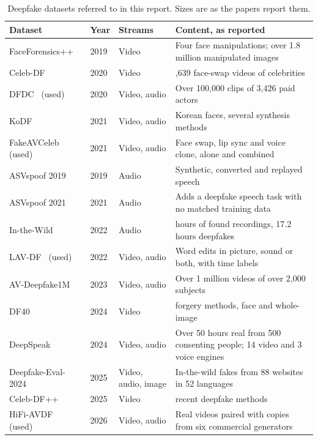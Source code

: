 \begin{table}[ht]
    \centering
    \small
    \caption{Deepfake datasets referred to in this report. Sizes are as the papers report them.}
    \label{tab:datasets}
    \begin{tabularx}{\textwidth}{@{}l l l >{\raggedright\arraybackslash}X@{}}
        \toprule
        \textbf{Dataset} & \textbf{Year} & \textbf{Streams} & \textbf{Content, as reported} \\
        \midrule
        FaceForensics++~\cite{ffpp} & 2019 & Video & Four face manipulations; over 1.8 million manipulated images \\
        Celeb-DF~\cite{celebdf} & 2020 & Video & 5,639 face-swap videos of celebrities \\
        DFDC~\cite{dfdc} (used) & 2020 & Video, audio & Over 100,000 clips of 3,426 paid actors \\
        KoDF~\cite{kodf} & 2021 & Video, audio & Korean faces, several synthesis methods \\
        FakeAVCeleb~\cite{fakeavceleb} (used) & 2021 & Video, audio & Face swap, lip sync and voice clone, alone and combined \\
        ASVspoof 2019~\cite{asvspoof2019} & 2019 & Audio & Synthetic, converted and replayed speech \\
        ASVspoof 2021~\cite{asvspoof2021} & 2021 & Audio & Adds a deepfake speech task with no matched training data \\
        In-the-Wild~\cite{mueller2022} & 2022 & Audio & 37.9 hours of found recordings, 17.2 hours deepfakes \\
        LAV-DF~\cite{lavdf} (used) & 2022 & Video, audio & Word edits in picture, sound or both, with time labels \\
        AV-Deepfake1M~\cite{avdeepfake1m} & 2023 & Video, audio & Over 1 million videos of over 2,000 subjects \\
        DF40~\cite{df40} & 2024 & Video & 40 forgery methods, face and whole-image \\
        DeepSpeak~\cite{deepspeak} & 2024 & Video, audio & Over 50 hours real from 500 consenting people; 14 video and 3 voice engines \\
        Deepfake-Eval-2024~\cite{dfeval2024} & 2025 & Video, audio, image & In-the-wild fakes from 88 websites in 52 languages \\
        Celeb-DF++~\cite{celebdfpp} & 2025 & Video & 22 recent deepfake methods \\
        HiFi-AVDF~\cite{havic} (used) & 2026 & Video, audio & Real videos paired with copies from six commercial generators \\
        \bottomrule
    \end{tabularx}
\end{table}

